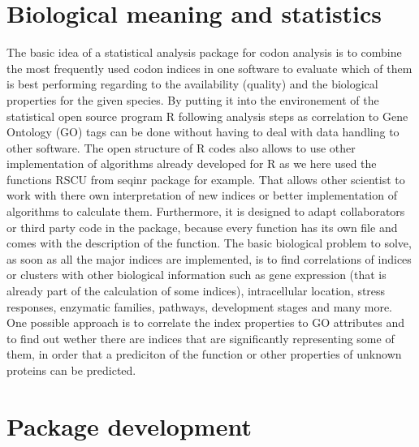\section{Biological meaning and statistics}
The basic idea of a statistical analysis package for codon analysis is to combine the most frequently used codon indices in one software to evaluate which of them is best performing regarding to the availability (quality) and the biological properties for the given species. By putting it into the environement of the statistical open source program R following analysis steps as correlation to Gene Ontology (GO) tags can be done without having to deal with data handling to other software. The open structure of R codes also allows to use other implementation of algorithms already developed for R as we here used the functions RSCU from seqinr package for example. That allows other scientist to work with there own interpretation of new indices or better implementation of algorithms to calculate them. Furthermore, it is designed to adapt collaborators or third party code in the package, because every function has its own file and comes with the description of the function.
The basic biological problem to solve, as soon as all the major indices are implemented, is to find correlations of indices or clusters with other biological information such as gene expression (that is already part of the calculation of some indices), intracellular location, stress responses, enzymatic families, pathways, development stages and many more. One possible approach is to correlate the index properties to GO attributes and to find out wether there are indices that are significantly representing some of them, in order that a prediciton of the function or other properties of unknown proteins can be predicted.

\section{Package development}